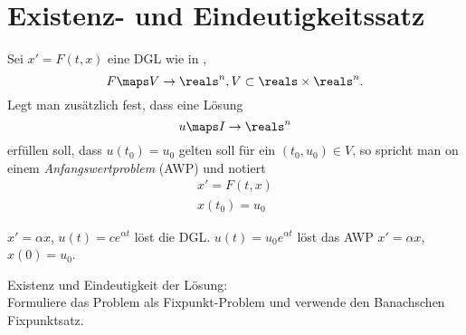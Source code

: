 \section{Existenz- und Eindeutigkeitssatz}
Sei \( x'=F(t,x) \) eine DGL wie in ,
\begin{equation*}
  F\maps V\to \reals^n, V\subset \reals\times \reals^n.
\end{equation*}
Legt man zusätzlich fest, dass eine Lösung
\begin{equation*}
  u\maps I\to \reals^n
\end{equation*}
erfüllen soll, dass \( u(t_0)=u_0 \) gelten soll für ein \( (t_0,u_0)\in V \), so spricht man on einem \emph{Anfangswertproblem} (AWP) und notiert
\begin{equation*}
  \begin{gathered}
    x'=F(t,x)\\
    x(t_0)=u_0
  \end{gathered}\tag{\(*\)}\label{eq:awp}
\end{equation*}
\begin{beispiel*}
  \( x'=\alpha x \), \( u(t)=c e^{\alpha t} \) löst die DGL\@. \( u(t)=u_0 e^{\alpha t} \) löst das AWP \( x'=\alpha x \), \( x(0)=u_0 \).
\end{beispiel*}
Existenz und Eindeutigkeit der Lösung: \\
Formuliere das Problem als Fixpunkt-Problem und verwende den Banachschen Fixpunktsatz.

